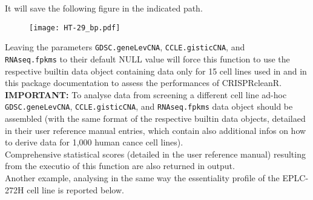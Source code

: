 \documentclass{article}\usepackage[]{graphicx}\usepackage[]{color}
\begin{document}
It will save the following figure in the indicated path. 
\begin{figure}[!h]
\centering
\texttt{[image: HT-29\_bp.pdf]}
\end{figure}

Leaving the parameters \texttt{GDSC.geneLevCNA}, \texttt{CCLE.gisticCNA}, and\\ \texttt{RNAseq.fpkms} to their default NULL value will force this function to use the respective builtin data object containing data only for 15 cell lines used in \cite{Iorio:2017} and in this package documentation to assess the performances of CRISPRcleanR.\\

\textbf{IMPORTANT:} To analyse data from screening a different cell line ad-hoc \texttt{GDSC.geneLevCNA}, \texttt{CCLE.gisticCNA}, and \texttt{RNAseq.fpkms} data object should be assembled (with the same format of the respective builtin data objects, detailaed in their user reference manual entries, which contain also additional infos on how to derive data for 1,000 human cance cell lines).\\

Comprehensive statistical scores (detailed in the user reference manual) resulting from the executio of this function are also returned in output.\\

Another example, analysing in the same way the essentiality profile of the EPLC-272H cell line is reported below.
\end{document}
